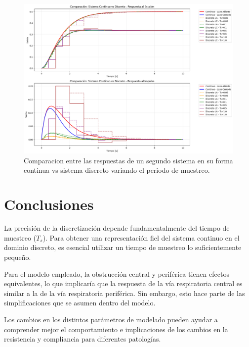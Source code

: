 \documentclass[journal]{IEEEtran}
\begin{document}
\begin{figure}[h!]
    \centering
    \includegraphics[width=1\linewidth]{Comparacion_P5.png}
    \caption{Comparacion entre las respuestas de un segundo sistema en su forma continua vs sistema discreto variando el periodo de muestreo.}
    \label{fig:simulacion_P5}
\end{figure}





\section{Conclusiones}

La precisión de la discretización depende fundamentalmente del tiempo de muestreo ($T_s$). Para obtener una representación fiel del sistema continuo en el dominio discreto, es esencial utilizar un tiempo de muestreo lo suficientemente pequeño.

Para el modelo empleado, la obstrucción central y periférica tienen efectos equivalentes, lo que implicaría que la respuesta de la vía respiratoria central es similar a la de la vía respiratoria periférica. Sin embargo, esto hace parte de las simplificaciones que se asumen dentro del modelo.

Los cambios en los distintos parámetros de modelado pueden ayudar a comprender mejor el comportamiento e implicaciones de los cambios en la resistencia y compliancia para diferentes patologías.


\end{document}
